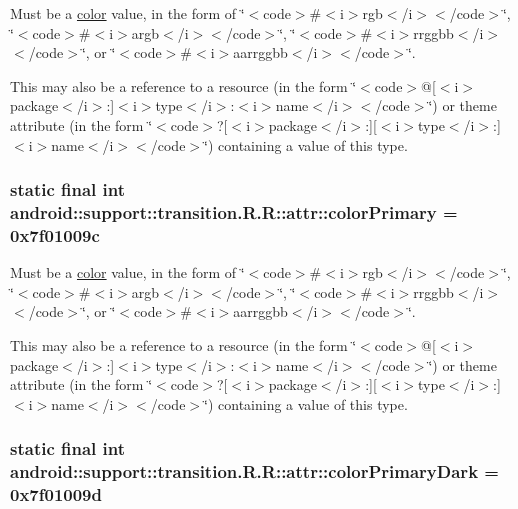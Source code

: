 Must be a \hyperlink{classandroid_1_1support_1_1transition_1_1_r_1_1color}{color} value, in the form of \char`\"{}$<$code$>$\#$<$i$>$rgb$<$/i$>$$<$/code$>$\char`\"{}, \char`\"{}$<$code$>$\#$<$i$>$argb$<$/i$>$$<$/code$>$\char`\"{}, \char`\"{}$<$code$>$\#$<$i$>$rrggbb$<$/i$>$$<$/code$>$\char`\"{}, or \char`\"{}$<$code$>$\#$<$i$>$aarrggbb$<$/i$>$$<$/code$>$\char`\"{}. 

This may also be a reference to a resource (in the form \char`\"{}$<$code$>$@\mbox{[}$<$i$>$package$<$/i$>$:\mbox{]}$<$i$>$type$<$/i$>$:$<$i$>$name$<$/i$>$$<$/code$>$\char`\"{}) or theme attribute (in the form \char`\"{}$<$code$>$?\mbox{[}$<$i$>$package$<$/i$>$:\mbox{]}\mbox{[}$<$i$>$type$<$/i$>$:\mbox{]}$<$i$>$name$<$/i$>$$<$/code$>$\char`\"{}) containing a value of this type. \hypertarget{classandroid_1_1support_1_1transition_1_1_r_1_1attr_359996328de40bdc3bc2ffa4a27733c4}{
\subsubsection[{colorPrimary}]{\setlength{\rightskip}{0pt plus 5cm}static final int android::support::transition.R.R::attr::colorPrimary = 0x7f01009c}}
\label{classandroid_1_1support_1_1transition_1_1_r_1_1attr_359996328de40bdc3bc2ffa4a27733c4}


Must be a \hyperlink{classandroid_1_1support_1_1transition_1_1_r_1_1color}{color} value, in the form of \char`\"{}$<$code$>$\#$<$i$>$rgb$<$/i$>$$<$/code$>$\char`\"{}, \char`\"{}$<$code$>$\#$<$i$>$argb$<$/i$>$$<$/code$>$\char`\"{}, \char`\"{}$<$code$>$\#$<$i$>$rrggbb$<$/i$>$$<$/code$>$\char`\"{}, or \char`\"{}$<$code$>$\#$<$i$>$aarrggbb$<$/i$>$$<$/code$>$\char`\"{}. 

This may also be a reference to a resource (in the form \char`\"{}$<$code$>$@\mbox{[}$<$i$>$package$<$/i$>$:\mbox{]}$<$i$>$type$<$/i$>$:$<$i$>$name$<$/i$>$$<$/code$>$\char`\"{}) or theme attribute (in the form \char`\"{}$<$code$>$?\mbox{[}$<$i$>$package$<$/i$>$:\mbox{]}\mbox{[}$<$i$>$type$<$/i$>$:\mbox{]}$<$i$>$name$<$/i$>$$<$/code$>$\char`\"{}) containing a value of this type. \hypertarget{classandroid_1_1support_1_1transition_1_1_r_1_1attr_62b9ee3497ca264761b19d1e363b0c3b}{
\subsubsection[{colorPrimaryDark}]{\setlength{\rightskip}{0pt plus 5cm}static final int android::support::transition.R.R::attr::colorPrimaryDark = 0x7f01009d}}
\label{classandroid_1_1support_1_1transition_1_1_r_1_1attr_62b9ee3497ca264761b19d1e363b0c3b}


